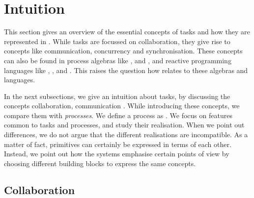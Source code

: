 


\section{Intuition}
\label{sec:comparison}


This section gives an overview of the essential concepts of tasks and how they are represented in \TOPHAT.
While tasks are focussed on collaboration, they give rise to concepts like communication, concurrency and synchronisation.
These concepts can also be found in process algebras like \CSP, \CCS and \PICALC, 
and reactive programming languages like \ESTEREL, \HIPHOP, and .
This raises the question how \TOPHAT relates to these algebras and languages.


In the next subsections, we give an intuition about tasks, by discussing the concepts collaboration, communication .
While introducing these concepts, we compare them with \emph{processes}.
We define a process as .
We focus on features common to tasks and processes, and study their realisation.
When we point out differences, we do not argue that the different realisations are incompatible.
As a matter of fact, primitives can certainly be expressed in terms of each other.
Instead, we point out how the systems emphasise certain points of view by choosing different building blocks to express the same concepts.





\subsection{Collaboration}

